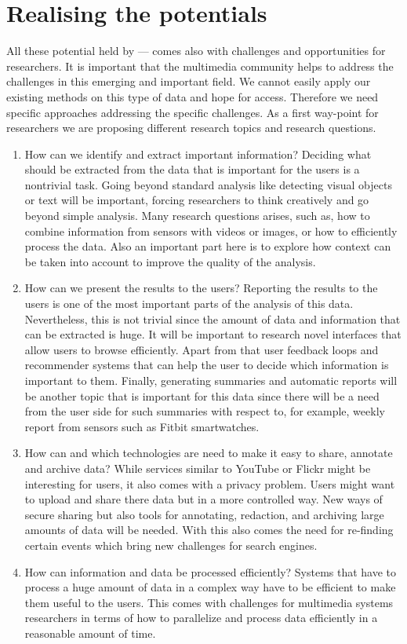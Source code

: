 \section{Realising the potentials}
All these potential held by --- comes also with challenges and opportunities for researchers.
It is important that the multimedia community helps to address the challenges in this emerging and important field. 
We cannot easily apply our existing methods on this type of data and hope for access. Therefore we need specific
approaches addressing the specific challenges.
As a first way-point for researchers we are proposing different research topics and research questions.
\begin{enumerate}
	\item How can we identify and extract important information? Deciding what should be extracted from the data that is important for the users is a nontrivial task. Going beyond standard analysis like detecting visual objects or text will be important, forcing researchers to think creatively and go beyond simple analysis. Many research questions arises, such as, how to combine information from sensors with videos or images, or how to efficiently process the data. Also an important part here is to explore how context can be taken into account to improve the quality of the analysis.
	
	\item How can we present the results to the users? 
	Reporting the results to the users is one of the most important parts of the analysis of this data. Nevertheless, this is not trivial since the amount of data and information that can be extracted is huge. It will be important to research novel interfaces that allow users to browse efficiently. Apart from that user feedback loops and recommender systems that can help the user to decide which information is important to them. Finally, generating summaries and automatic reports will be another topic that is important for this data since there will be a need from the user side for such summaries with respect to, for example, weekly report from sensors such as Fitbit smartwatches.
	
	\item How can and which technologies are need to make it easy to share, annotate and archive data? 
	While services similar to YouTube or Flickr might be interesting for users, it also comes with a privacy problem. Users might want to upload and share there data but in a more controlled way. New ways of secure sharing but also tools for annotating, redaction, and archiving large amounts of data will be needed. With this also comes the need for re-finding certain events which bring new challenges for search engines.  
	
	\item How can information and data be processed efficiently? Systems that have to process a huge amount of data in a complex way have to be efficient to make them useful to the users. This comes with challenges for multimedia systems researchers in terms of how to parallelize and process data efficiently in a reasonable amount of time.
\end{enumerate}

